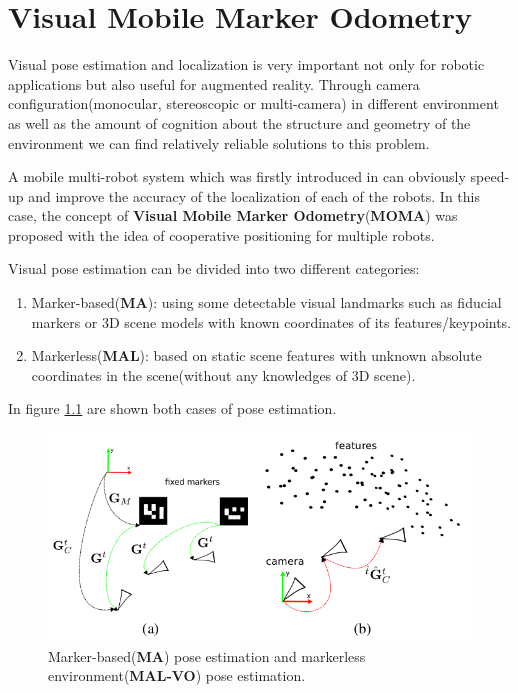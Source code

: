 \chapter{Visual Mobile Marker Odometry}
\label{chap:Visual Mobile Marker Odometry}


Visual pose estimation and localization is very important not only for robotic applications but also useful for augmented reality. Through camera configuration(monocular,
stereoscopic or multi-camera) in different environment as well as the amount of cognition about the structure and geometry of the environment 
we can find relatively reliable solutions to this problem.

A mobile multi-robot system which was firstly introduced in \cite{kurazume1994cooperative}
can obviously speed-up and improve the accuracy of the localization
of each of the robots. In this case, the concept of \textbf{Visual Mobile Marker Odometry}(\textbf{MOMA}) was proposed with the idea of cooperative positioning for multiple robots\cite{acuna2017moma}. 

Visual pose estimation can be divided into two different categories:

\begin{enumerate}
\item Marker-based(\textbf{MA}): using some detectable visual landmarks such as fiducial markers or 3D scene models with known coordinates of its features/keypoints\cite{acuna2017moma}. 
\item Markerless(\textbf{MAL}): based on static scene features with unknown absolute coordinates in the scene(without any knowledges of 3D scene).
\end{enumerate}

In figure \ref{fig:ma_mal} are shown both cases of pose estimation.
\begin{figure}[H]
\centering
\includegraphics[scale=0.5]{./fig/ma_mal.png}
\caption{Marker-based(\textbf{MA}) pose estimation and markerless environment(\textbf{MAL-VO}) pose estimation\cite{acuna2017moma}.} 
\label{fig:ma_mal}
\end{figure}

